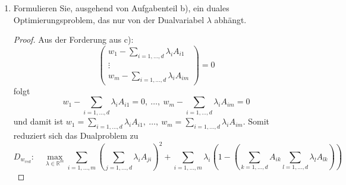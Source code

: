 \documentclass[12pt]{extreport} %
\newcommand{\R}{\mathbb{R}}
\theoremstyle{named}
\theoremstyle{nnamed}
\theoremstyle{itshape}
\theoremstyle{normal}
\begin{document}
\begin{enumerate}
\begin{proof}
\begin{align*}
			& = \left(\begin{array}{c} w_1 -\sum_{i=1,\dotsc,d}  \lambda_i A_{i1}  \\ \vdots \\ w_m -\sum_{i=1,\dotsc,d}  \lambda_i A_{im} \end{array}\right) 
			\end{align*}
		\end{proof}
	\item Formulieren Sie, ausgehend von Aufgabenteil b), ein duales Optimierungsproblem, das nur von der Dualvariabel $\lambda$ abhängt.
		\begin{proof}
			Aus der Forderung aus c):
			$$ \left(\begin{array}{c} w_1 -\sum_{i=1,\dotsc,d}  \lambda_i A_{i1}  \\ \vdots \\ w_m -\sum_{i=1,\dotsc,d}  \lambda_i A_{im} \end{array}\right)  = 0 $$
			folgt
			$$ w_1 -\sum_{i=1,\dotsc,d}  \lambda_i A_{i1} = 0, ~ \dotsc, ~ w_m -\sum_{i=1,\dotsc,d}  \lambda_i A_{im}	= 0 $$
			und damit ist $w_1 = \sum_{i=1,\dotsc,d}  \lambda_i A_{i1}, ~ \dotsc, ~ w_m = \sum_{i=1,\dotsc,d}  \lambda_i A_{im}$.
			Somit reduziert sich das Dualproblem zu
		 	$$ D_{w_{red}}: \quad \max_{\lambda \in \R^m} \sum_{i=1, \dotsc,m } \left( \sum_{j=1, \dotsc, d} \lambda_i A_{ji} \right)^2 + \sum_{i = 1, \dotsc, m} \lambda_i \left( 1 - \left(\sum_{k = 1, \dotsc, d} A_{ik} \sum_{l=1,\dotsc,d}  \lambda_l A_{lk} \right) \right) $$
		\end{proof}
\end{enumerate}
\end{document}
